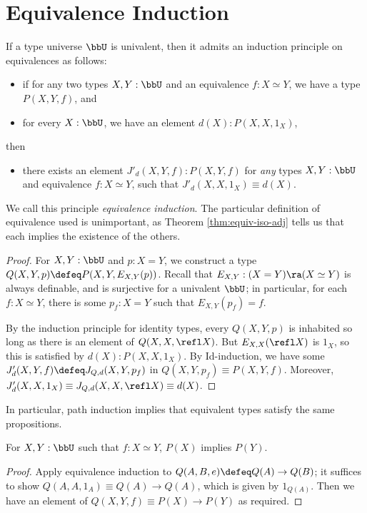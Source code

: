 
\section{Equivalence Induction}

If a type universe $\bbU$ is univalent, then it admits an induction principle on
equivalences as follows:
\begin{itemize}
\item if for any two types $X,Y:\bbU$ and an equivalence $f:X\simeq Y$, we have
a type $P(X,Y,f)$, and
\item for every $X:\bbU$, we have an element $d(X):P(X,X,1_X)$,
\end{itemize}
then
\begin{itemize}
\item there exists an element $J'_d(X,Y,f):P(X,Y,f)$ for \emph{any} types
$X,Y:\bbU$ and equivalence $f:X\simeq Y$, such that $J'_d(X,X,1_X)\equiv d(X)$.
\end{itemize}
We call this principle \emph{equivalence induction}. The particular definition
of equivalence used is unimportant, as Theorem \ref{thm:equiv-iso-adj} tells us
that each implies the existence of the others.

\begin{proof}
For $X,Y:\bbU$ and $p:X=Y$, we construct a type $Q(X,Y,p)\defeq
P(X,Y,E_{X,Y}(p))$. Recall that $E_{X,Y}:(X=Y)\ra (X\simeq Y)$ is always
definable, and is surjective for a univalent $\bbU$; in particular, for each
$f:X\simeq Y$, there is some $p_f:X=Y$ such that $E_{X,Y}(p_f)=f$. 

By the induction principle for identity types, every $Q(X,Y,p)$ is inhabited so
long as there is an element of $Q(X,X,\refl X)$. But $E_{X,X}(\refl X)$ is
$1_X$, so this is satisfied by $d(X):P(X,X,1_X)$. By Id-induction, we have some
$J'_d(X,Y,f)\defeq J_{Q,d}(X,Y,p_f)$ in $Q(X,Y,p_f)\equiv P(X,Y,f)$. Moreover,
$J'_d(X,X,1_X)\equiv J_{Q,d}(X,X,\refl X)\equiv d(X)$.
\end{proof}

In particular, path induction implies that equivalent types satisfy the same
propositions.
\begin{cor}
For $X,Y:\bbU$ such that $f:X\simeq Y$, $P(X)$ implies $P(Y)$.
\end{cor}
\begin{proof}
Apply equivalence induction to $Q(A,B,e)\defeq Q(A)\to Q(B)$; it suffices to
show $Q(A,A,1_A)\equiv Q(A)\to Q(A)$, which is given by $1_{Q(A)}$. Then we have
an element of $Q(X,Y,f)\equiv P(X)\to P(Y)$ as required.
\end{proof}

